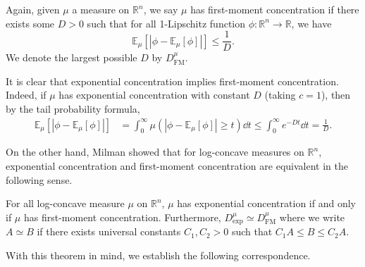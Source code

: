 \begin{definition}
  Again, given \(\mu\) a measure on \(\mathbb{R}^n\), we say \(\mu\) has first-moment concentration 
  if there exists some \(D > 0\) such that for all 1-Lipschitz function 
  \(\phi : \mathbb{R}^n \to \mathbb{R}\), we have
  \begin{equation}
    \mathbb{E}_\mu[|\phi - \mathbb{E}_\mu[\phi]|] \le \frac{1}{D}.
  \end{equation}
  We denote the largest possible \(D\) by \(D^\mu_{\text{FM}}\).
\end{definition}

It is clear that exponential concentration implies first-moment concentration. Indeed, if \(\mu\) 
has exponential concentration with constant \(D\) (taking \(c = 1\)), then by the tail probability formula,
\begin{align*}
  \mathbb{E}_\mu[|\phi - \mathbb{E}_\mu[\phi]|] 
  & = \int_0^\infty \mu(|\phi - \mathbb{E}_\mu[\phi]| \ge t) \dd t \le \int_0^\infty e^{-Dt} \dd t 
   = \frac{1}{D}.
\end{align*}

On the other hand, Milman showed that for log-concave measures on \(\mathbb{R}^n\), exponential concentration 
and first-moment concentration are equivalent in the following sense. 

\begin{theorem}\label{thm:milman}
  For all log-concave measure \(\mu\) on \(\mathbb{R}^n\), \(\mu\) has exponential concentration 
  if and only if \(\mu\) has first-moment concentration. Furthermore, 
  \(D^\mu_{\text{exp}} \simeq D^\mu_{\text{FM}}\) where we write \(A \simeq B\) if there exists 
  universal constants \(C_1, C_2 > 0\) such that \(C_1 A \le B \le C_2 A\).
\end{theorem}

With this theorem in mind, we establish the following correspondence.

